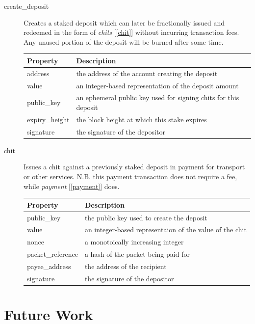 \documentclass[letterpaper,11pt]{article}
\begin{document}
\begin{description}
\item [create\_deposit] Creates a staked deposit which can later be fractionally issued and redeemed in the form of \emph{chits} [\ref{chit}] without incurring transaction fees. Any unused portion of the deposit will be burned after some time.

\begin{table}[H]
  \centering
  \begin{tabularx}{\textwidth}{l X}
      \toprule
      Property & Description \\ \midrule
      address & the address of the account creating the deposit \\
      value & an integer-based representation of the deposit amount \\
      public\_key & an ephemeral public key used for signing chits for this deposit \\
      expiry\_height & the block height at which this stake expires \\
      signature & the signature of the depositor
  \end{tabularx}
\end{table}

\item [chit] \label{chit} Issues a chit against a previously staked deposit in payment for transport or other services. N.B. this payment transaction does not require a fee, while \emph{payment} [\ref{payment}] does.

\begin{table}[H]
  \centering
  \begin{tabularx}{\textwidth}{l X}
      \toprule
      Property & Description \\ \midrule
      public\_key & the public key used to create the deposit \\
      value & an integer-based representaion of the value of the chit \\
      nonce & a monotoically increasing integer \\
      packet\_reference & a hash of the packet being paid for \\
      payee\_address & the address of the recipient \\
      signature & the signature of the depositor
  \end{tabularx}
\end{table}

\end{description}

\section{Future Work}
\end{document}
